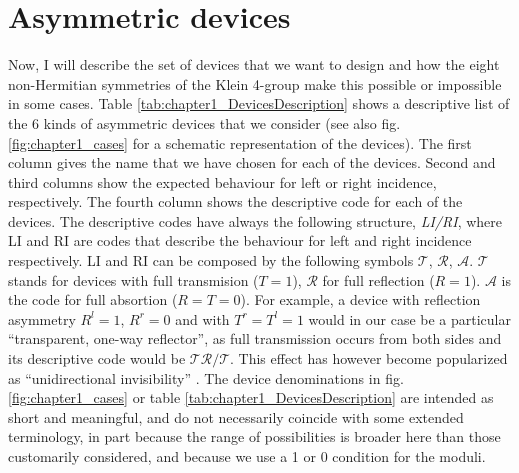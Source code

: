 \section{Asymmetric devices\label{sec:chapter1_AsymmetricDevices}}




Now, I will describe the set of devices that we want to design and how the eight non-Hermitian symmetries of the Klein 4-group make this possible or impossible in some cases. Table \ref{tab:chapter1_DevicesDescription} shows a descriptive list of the 6 kinds of asymmetric devices that we consider (see also fig. \ref{fig:chapter1_cases} for a schematic representation of the devices). The first column gives the name that we have chosen for each of the devices. Second and third columns show the expected behaviour for left or right incidence, respectively. The fourth column shows the descriptive code for each of the devices. The descriptive codes have always the following structure, \textit{LI/RI}, where LI and RI are codes that describe the behaviour for left and right incidence respectively. LI and RI can be composed by the following symbols $\mathcal{T}$, $\mathcal{R}$, $\mathcal{A}$. $\mathcal{T}$ stands for devices with full transmision ($T=1$), $\mathcal{R}$ for full reflection ($R = 1$). $\mathcal{A}$ is the code for full absortion ($R=T=0$). For example, a device with reflection asymmetry $R^l=1$, $R^r=0$ and with $T^r=T^l=1$ would in our case be a particular ``transparent, one-way reflector'', as full transmission occurs from both sides and its descriptive code would be $\mathcal{T}\mathcal{R}/\mathcal{T}$. This effect has however become popularized as ``unidirectional invisibility'' \cite{Lin2011,Yin2013}. The device denominations in fig. \ref{fig:chapter1_cases} or table \ref{tab:chapter1_DevicesDescription} are intended as short and meaningful, and do not necessarily coincide with some extended terminology, in part because the range of possibilities is broader here than those customarily considered, and because we use a 1 or 0 condition for the moduli.

